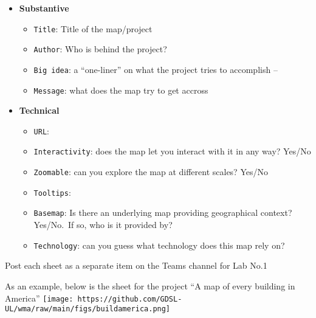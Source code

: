 \documentclass[
  letterpaper,
  DIV=11,
  numbers=noendperiod]{scrreprt}
\providecommand{\tightlist}{%
  \setlength{\itemsep}{0pt}\setlength{\parskip}{0pt}}\usepackage{longtable,booktabs,array}
\begin{document}
\begin{itemize}
\item
  \textbf{Substantive}

  \begin{itemize}
  \tightlist
  \item
    \texttt{Title}: Title of the map/project
  \item
    \texttt{Author}: Who is behind the project?
  \item
    \texttt{Big\ idea}: a ``one-liner'' on what the project tries to
    accomplish --
  \item
    \texttt{Message}: what does the map try to get accross
  \end{itemize}
\item
  \textbf{Technical}

  \begin{itemize}
  \tightlist
  \item
    \texttt{URL}:
  \item
    \texttt{Interactivity}: does the map let you interact with it in any
    way? Yes/No
  \item
    \texttt{Zoomable}: can you explore the map at different scales?
    Yes/No
  \item
    \texttt{Tooltips}:
  \item
    \texttt{Basemap}: Is there an underlying map providing geographical
    context? Yes/No.~If so, who is it provided by?
  \item
    \texttt{Technology}: can you guess what technology does this map
    rely on?
  \end{itemize}
\end{itemize}

Post each sheet as a separate item on the Teams channel for Lab No.1

As an example, below is the sheet for the project ``A map of every
building in America''
\texttt{[image: https://github.com/GDSL-UL/wma/raw/main/figs/buildamerica.png]}
\end{document}
